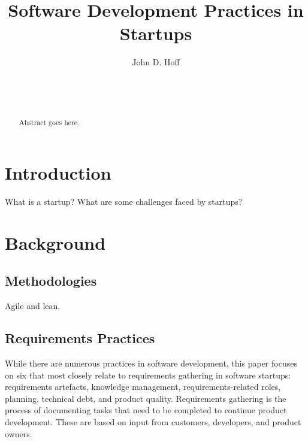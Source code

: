 \documentclass{sig-alternate}
\begin{document}

\title{Software Development Practices in Startups}


\author{
\alignauthor
John D. Hoff\\
	\\
	\\
	\\
}

\maketitle
\begin{abstract}
Abstract goes here.

\end{abstract}


\section{Introduction}
\label{sec:introduction}
What is a startup? What are some challenges faced by startups?

\section{Background}
\label{sec:background}

\subsection{Methodologies}
\label{sec:methodologies}
Agile and lean.

\subsection{Requirements Practices}
\label{sec:practices}
While there are numerous practices in software development, this paper focuses on six that most closely relate to requirements gathering in software startups: requirements artefacts, knowledge management, requirements-related roles, planning, technical debt, and product quality. Requirements gathering is the process of documenting tasks that need to be completed to continue product development. These are based on input from customers, developers, and product owners. 
\end{document}
